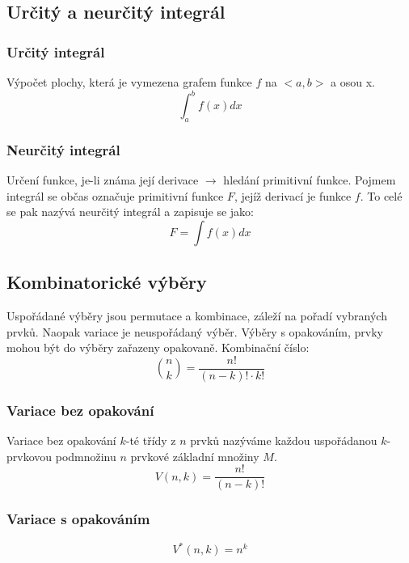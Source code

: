 \subsection{Určitý a neurčitý integrál}
\subsubsection{Určitý integrál}
Výpočet plochy, která je vymezena grafem funkce $f$ na $<a,b>$ a osou x.
\begin{equation}
\int_a^b f(x) dx
\end{equation}
\subsubsection{Neurčitý integrál}
Určení funkce, je-li známa její derivace $\rightarrow$ hledání primitivní funkce. Pojmem integrál se občas označuje primitivní funkce $F$, jejíž derivací je funkce $f$. To celé se pak nazývá neurčitý integrál a zapisuje se jako:
\begin{equation}
 F = \int f(x) dx
\end{equation}

\subsection{Kombinatorické výběry}
Uspořádané výběry jsou permutace a kombinace, záleží na pořadí vybraných prvků. Naopak variace je neuspořádaný výběr. Výběry s opakováním, prvky mohou být do výběry zařazeny opakovaně.
Kombinační číslo:
\begin{equation}
\binom{n}{k} = \frac{n!}{(n-k)!\cdot k!}
\end{equation}
\subsubsection{Variace bez opakování}
Variace bez opakování $k$-té třídy z $n$ prvků nazýváme každou uspořádanou $k$-prvkovou podmnožinu $n$ prvkové základní množiny $M$.
\begin{equation}
V(n,k) = \frac{n!}{(n-k)!}
\end{equation}
\subsubsection{Variace s opakováním}
\begin{equation}
V^*(n,k) = n^k	
\end{equation}
